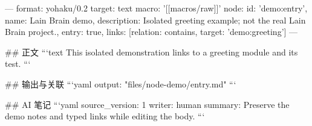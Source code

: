 ---
format: yohaku/0.2
target: text
macro: '[[macros/raw]]'
node: {id: 'demo:entry', name: Lain Brain demo, description: Isolated greeting example; not the real Lain Brain project., entry: true, links: [{relation: contains, target: 'demo:greeting'}]}
---

## 正文
```text
This isolated demonstration links to a greeting module and its test.
```

## 输出与关联
```yaml
output: "files/node-demo/entry.md"
```

## AI 笔记
```yaml
source_version: 1
writer: human
summary: Preserve the demo notes and typed links while editing the body.
```
